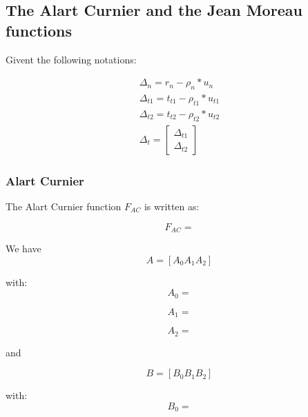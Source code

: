 \documentclass[a4paper]{article}
\begin{document}
\subsection{The Alart Curnier and the Jean Moreau functions}

Givent the following notations:

\begin{equation}
  \begin{array}{c}
    \Delta_n = r_n -\rho_n * u_n\\
    \Delta_{t1} = t_{t1} - \rho_{t1} * u_{t1}\\
    \Delta_{t2} = t_{t2} - \rho_{t2} * u_{t2}\\
    \Delta_{t} = \left [
      \begin{array}{c}
        \Delta_{t1}\\
        \Delta_{t2}
      \end{array} \right]
  \end{array}
\end{equation}

\subsubsection{Alart Curnier}

The Alart Curnier function $F_{AC}$ is written as:

\begin{equation}
  F_{AC} = 
\end{equation}

We have 
\begin{equation}
  A = \left[ A_0 A_1 A_2 \right]
\end{equation}

with:
\begin{equation}
  A_0 = 
\end{equation}

\begin{equation}
  A_1 = 
\end{equation}

\begin{equation}
  A_2 = 
\end{equation}

and

\begin{equation}
  B = \left[ B_0 B_1 B_2 \right]
\end{equation}

with:
\begin{equation}
  B_0 = 
\end{equation}
\end{document}
